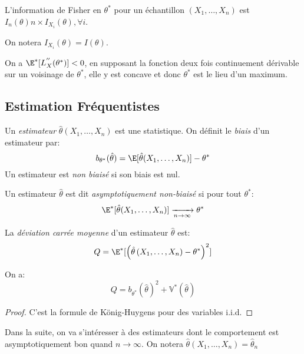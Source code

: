 \documentclass[info, math, french]{mpb-cours}
\def\tstar{\theta^{*}}
\def\that{\hat{\theta}}
\def\V{\mathbb{V}}
\def\define#1{\emph{\textcolor{vulm}{#1}}}
\begin{document}
\begin{proposition}
	L'information de Fisher en $\tstar$ pour un échantillon $(X_{1}, \ldots, X_{n})$ est $I_{n}(\theta) n \times I_{X_{i}}(\theta), \forall i$.
\end{proposition}
On notera $I_{X_{i}}(\theta) = I(\theta)$.

\begin{remarque}
	On a $\E^{*}[L_{X}^{''}(\tstar)] < 0$, en supposant la fonction deux fois continuement dérivable sur un voisinage de $\tstar$, elle y est concave et donc $\tstar$ est le lieu d'un maximum.
\end{remarque}

\subsection{Estimation Fréquentistes}
\begin{definition}
	Un \define{estimateur} $\that(X_{1}, \ldots, X_{n})$ est une statistique.
	On définit le \define{biais} d'un estimateur par:
	\begin{equation*}
		b_{\tstar}(\that) = \E[\that(X_{1}, \ldots, X_{n})] - \tstar
	\end{equation*}
	Un estimateur est \define{non biaisé} si son biais est nul.
\end{definition}

\begin{definition}
	Un estimateur $\that$ est dit \define{asymptotiquement non-biaisé} si pour tout $\tstar$:
	\begin{equation*}
		\E^{*}[\that(X_{1}, \ldots, X_{n})] \xrightarrow[n \to \infty]{} \tstar
	\end{equation*}
\end{definition}

\begin{definition}
	La \define{déviation carrée moyenne} d'un estimateur $\that$ est:
	\begin{equation*}
		Q = \E^{*}[\left(\that\left(X_{1}, \ldots, X_{n}\right) - \tstar\right)^{2}]
	\end{equation*}
\end{definition}

\begin{proposition}
	On a:
	\begin{equation*}
		Q = b_{\tstar}\left(\that\right)^{2} + \V^{*}\left(\that\right)
	\end{equation*}
\end{proposition}
\begin{proof}
	C'est la formule de König-Huygens pour des variables i.i.d.
\end{proof}
Dans la suite, on va s'intéresser à des estimateurs dont le comportement est asymptotiquement bon quand $n\to \infty$.
On notera $\that\left(X_{1}, \ldots, X_{n}\right) = \that_{n}$
\end{document}
